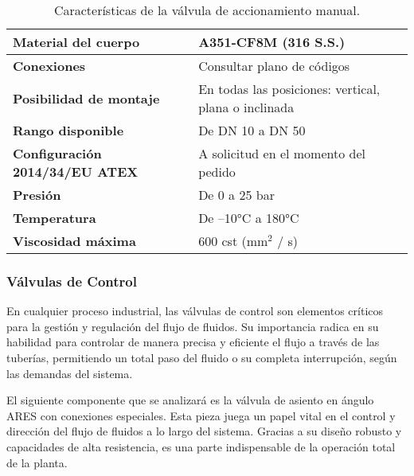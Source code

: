 \begin{table}[H]
    \centering
    \caption{Características de la válvula de accionamiento manual.}
    \label{table:valvula_operacion}
    \begin{tabular}{| L{6cm} | L{6cm} |}
        \hline
        \textbf{Material del cuerpo}           & A351-CF8M (316 S.S.)                                 \\
        \hline
        \textbf{Conexiones}                    & Consultar plano de códigos                           \\
        \hline
        \textbf{Posibilidad de montaje}        & En todas las posiciones: vertical, plana o inclinada \\
        \hline
        \textbf{Rango disponible}              & De DN 10 a DN 50                                     \\
        \hline
        \textbf{Configuración 2014/34/EU ATEX} & A solicitud en el momento del pedido                 \\
        \hline
        \textbf{Presión}                       & De 0 a 25 bar                                        \\
        \hline
        \textbf{Temperatura}                   & De –10°C a 180°C                                     \\
        \hline
        \textbf{Viscosidad máxima}             & 600 cst (mm$^2$ / s)                                 \\
        \hline
    \end{tabular}
\end{table}


\subsubsection{Válvulas de Control} \label{sec:valvula_OnOff}

En cualquier proceso industrial, las válvulas de control son elementos críticos para la gestión y regulación del flujo de fluidos.
Su importancia radica en su habilidad para controlar de manera precisa y eficiente el flujo a través de las tuberías, permitiendo un
total paso del fluido o su completa interrupción, según las demandas del sistema.

El siguiente componente que se analizará es la válvula de asiento en ángulo ARES con conexiones especiales. Esta pieza juega un papel vital en el control y dirección del flujo de fluidos a lo largo del sistema. Gracias a su diseño robusto y capacidades de alta resistencia, es una parte indispensable de la operación total de la planta.

